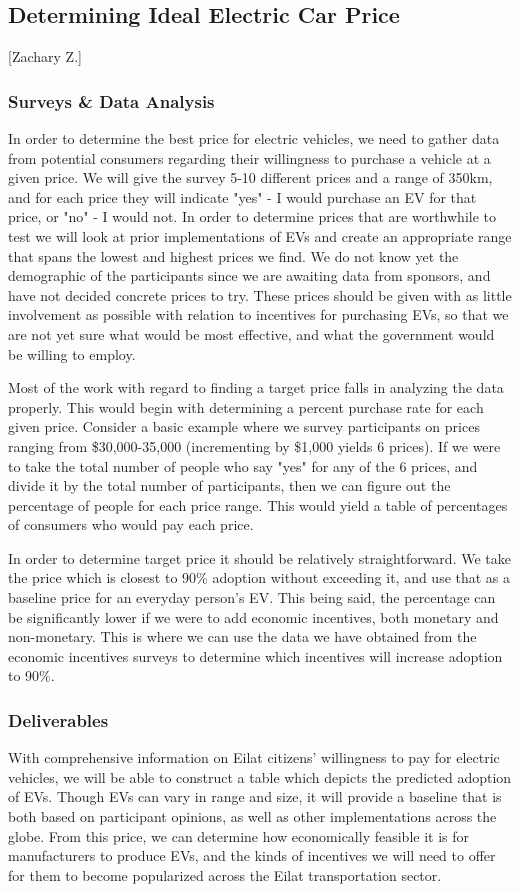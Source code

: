 \documentclass[12pt]{article}                         %
\begin{document}
\subsection{Determining Ideal Electric Car Price}[Zachary Z.]

\subsubsection{Surveys \& Data Analysis}
In order to determine the best price for electric vehicles, we need to gather data from potential consumers regarding their willingness to purchase a vehicle at a given price. We will give the survey 5-10 different prices and a range of 350km, and for each price they will indicate "yes" - I would purchase an EV for that price, or "no" - I would not.  In order to determine prices that are worthwhile to test we will look at prior implementations of EVs and create an appropriate range that spans the lowest and highest prices we find. We do not know yet the demographic of the participants since we are awaiting data from sponsors, and have not decided concrete prices to try. These prices should be given with as little involvement as possible with relation to incentives for purchasing EVs, so that we are not yet sure what would be most effective, and what the government would be willing to employ.

Most of the work with regard to finding a target price falls in analyzing the data properly. This would begin with determining a percent purchase rate for each given price. Consider a basic example where we survey participants on prices ranging from \$30,000-35,000 (incrementing by \$1,000 yields 6 prices). If we were to take the total number of people who say "yes" for any of the 6 prices, and divide it by the total number of participants, then we can figure out the percentage of people for each price range. This would yield a table of percentages of consumers who would pay each price.

In order to determine target price it should be relatively straightforward. We take the price which is closest to 90\% adoption without exceeding it, and use that as a baseline price for an everyday person's EV. This being said, the percentage can be significantly lower if we were to add economic incentives, both monetary and non-monetary. This is where we can use the data we have obtained from the economic incentives surveys to determine which incentives will increase adoption to 90\%. 

\subsubsection{Deliverables}
With comprehensive information on Eilat citizens' willingness to pay for electric vehicles, we will be able to construct a table which depicts the predicted adoption of EVs. Though EVs can vary in range and size, it will provide a baseline that is both based on participant opinions, as well as other implementations across the globe. From this price, we can determine how economically feasible it is for manufacturers to produce EVs, and the kinds of incentives we will need to offer for them to become popularized across the Eilat transportation sector.
\end{document}

